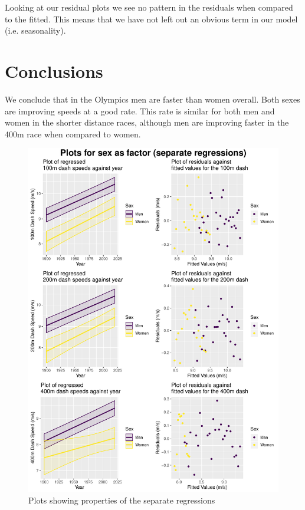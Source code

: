 \documentclass[11pt]{article}
\begin{document}
Looking at our residual plots we see no pattern in the residuals when compared to the fitted. This means that we have not left out an obvious term in our model (i.e. seasonality). 



\section{Conclusions}

We conclude that in the Olympics men are faster than women overall. Both sexes are improving speeds at a good rate. This rate is similar for both men and women in the shorter distance races, although men are improving faster in the 400m race when compared to women.


\begin{figure}
 
  \centering
    \includegraphics[width=\textwidth]{npplots}
 \caption{Plots showing properties of the separate regressions}
\label{fig:npplots}
\end{figure}
\end{document}
